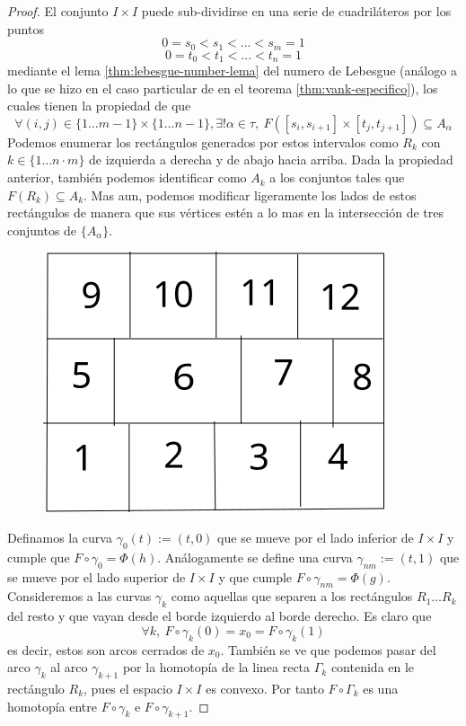 \begin{proof}
  El conjunto \(I \times I\) puede sub-dividirse en una serie de
  cuadriláteros por los puntos
  \[ 0 = s_0 < s_1 < ... < s_m = 1 \]
  \[ 0 = t_0 < t_1 < ... < t_n = 1 \]
  mediante el lema \ref{thm:lebesgue-number-lema} del numero de Lebesgue
  (análogo a lo que se hizo en el caso particular de
  \vank en el teorema \ref{thm:vank-especifico}), los cuales tienen
  la propiedad de que
  \[ \forall (i,j) \in \{1 \dotsc m-1 \} \times \{1 \dotsc n - 1\},
    \exists ! \alpha \in \tau,\ F \left( [s_i, s_{i+1}] \times [t_j,
    t_{j+1}] \right) \subseteq A_\alpha \]
  Podemos enumerar los rectángulos generados por estos intervalos como
  \(R_k\) con \(k \in \{1 \dotsc n\cdot m\}\) de izquierda a derecha y
  de abajo hacia arriba. Dada la propiedad anterior, también podemos
  identificar como \( A_k\) a los conjuntos tales que \(F \left( R_k
  \right) \subseteq A_k \). Mas aun, podemos modificar ligeramente los
  lados de estos rectángulos de manera que sus vértices estén a lo mas en
  la intersección de tres conjuntos de \(\{A_\alpha\}\).
  \begin{figure}[h]
    \centering \includegraphics[scale=0.5]{./imagenes/grilla.png}
  \end{figure}

  Definamos la curva \(\gamma_0 (t) := (t, 0)\) que se mueve por el lado
  inferior de \(I \times I\) y cumple que \(F \circ \gamma_0 = \Phi (h)
  \). Análogamente se define una curva \(\gamma_{nm} := (t,1)\) que se
  mueve por el lado superior de \(I \times I\) y que cumple \(F \circ
  \gamma_{nm} = \Phi (g)\). Consideremos a las curvas \(\gamma_k\) como
  aquellas que separen a los rectángulos \(R_1 \dots R_k\) del resto y que
  vayan desde el borde izquierdo al borde derecho. Es claro que
  \[ \forall k,\ F \circ \gamma_k (0) = x_0 = F \circ \gamma_k (1) \]
  es decir, estos son arcos cerrados de \(x_0\). También se ve que
  podemos pasar del arco \(\gamma_k\) al arco \(\gamma_{k+1}\) por la
  homotopía de la linea recta \(\Gamma_k\) contenida en le rectángulo
  \(R_k\), pues el espacio \(I \times I\) es convexo. Por tanto \(F \circ
  \Gamma_k\) es una homotopía entre \(F \circ \gamma_k\) e \(F \circ
  \gamma_{k+1}\).


\end{proof}
